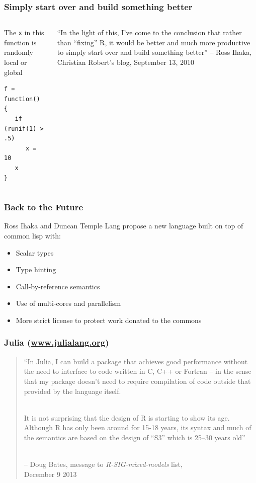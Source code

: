 \documentclass[svgnames]{beamer}
\begin{document}
\begin{frame}[fragile]
  \frametitle{Simply start over and build something better}

  \begin{columns}
    \begin{column}{4cm}
      The {\tt x} in this function is randomly local or global
\begin{verbatim}
f = function() {
   if (runif(1) > .5) 
      x = 10
   x
}
\end{verbatim}
    \end{column}
    \begin{column}{6cm}
    ``In the light of this, I've come to the conclusion that rather
    than ``fixing'' R, it would be better and much more productive to
    simply start over and build something better'' -- Ross Ihaka,
    Christian Robert's blog, September 13, 2010
    \end{column}
  \end{columns}

\end{frame}

\begin{frame}
  \frametitle{Back to the Future}

  Ross Ihaka and Duncan Temple Lang propose a new language built on
  top of common lisp with:
  \begin{itemize}
  \item Scalar types
  \item Type hinting
  \item Call-by-reference semantics
  \item Use of multi-cores and parallelism
  \item More strict license to protect work donated to the commons
  \end{itemize}

\end{frame}
    
\begin{frame}
  \frametitle{Julia (\url{www.julialang.org})}

  \begin{quote}
    ``In Julia, I can build a package that achieves good performance
    without the need to interface to code written in C, C++ or Fortran --
    in the sense that my package doesn't need to require compilation of
    code outside that provided by the language itself.

    ~\\
    
    It is not surprising that the design of R is starting to show its
    age. Although R has only been around for 15-18 years, its syntax
    and much of the semantics are based on the design of ``S3'' which
    is 25--30 years old''

    ~\\
    
    -- Doug Bates, message to {\em R-SIG-mixed-models} list,\\
    December 9 2013
  \end{quote}
  
\end{frame}
\end{document}
